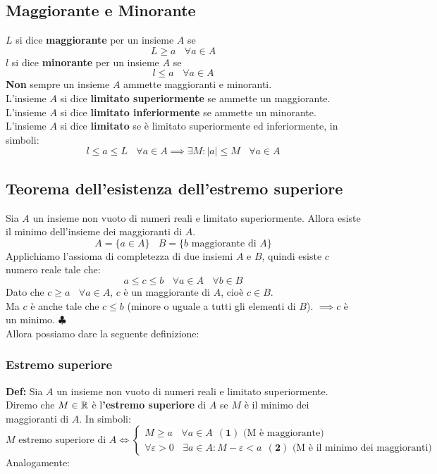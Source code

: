 \subsection{Maggiorante e Minorante}
$L$ si dice \textbf{maggiorante} per un insieme $A$ se
\[
    L \geq a \ \ \ \ \forall a \in A
\]
$l$ si dice \textbf{minorante} per un insieme $A$ se
\[
    l \leq a \ \ \ \ \forall a \in A
\]
\textbf{Non} sempre un insieme $A$ ammette maggioranti e minoranti.\\
L'insieme $A$ si dice \textbf{limitato superiormente} se ammette un maggiorante.\\
L'insieme $A$ si dice \textbf{limitato inferiormente} se ammette un minorante.\\
L'insieme $A$ si dice \textbf{limitato} se è limitato superiormente ed inferiormente, in simboli:
\[
    l\leq a \leq L \ \ \ \ \forall a \in A \implies \exists M : |a| \leq M \ \ \ \ \forall a \in A
\]

\subsection{Teorema dell'esistenza dell'estremo superiore}
Sia $A$ un insieme non vuoto di numeri reali e limitato superiormente. Allora
esiste il minimo dell'insieme dei maggioranti di $A$.
\[
    A = \{a\in A\} \ \ \ \ B = \{b \text{ maggiorante di } A\}
\]
Applichiamo l'assioma di completezza di due insiemi $A$ e $B$, quindi esiste
$c$ numero reale tale che:
\[
    a \leq c \leq b \ \ \ \ \forall a \in A \ \ \ \ \forall b \in B
\]
Dato che $c \geq a \ \ \ \ \forall a \in A$, $c$ è un maggiorante di $A$, cioè
$c \in B$.\\ Ma $c$ è anche tale che $c\leq b$ (minore o uguale a tutti gli
elementi di $B$). $\implies c$ è un minimo. $\clubsuit$\\ Allora possiamo dare
la seguente definizione:\\
\subsubsection{Estremo superiore}
\textbf{Def:} Sia $A$ un insieme non vuoto di numeri
reali e limitato superiormente. Diremo che $M\in \mathbb{R}$ è l\textbf{'estremo
    superiore} di $A$ se $M$ è il minimo dei maggioranti di $A$. In simboli:
\[
    M \text{ estremo superiore di } A \iff \begin{cases}
        M \geq a  \ \ \ \ \forall a \in A \ \ (\textbf{1}) \text{ (M è maggiorante)} \\
        \forall \varepsilon > 0 \ \ \ \ \exists a \in A : M - \varepsilon < a \ \ (\textbf{2}) \text{ (M è il minimo dei maggioranti)}
    \end{cases}
\]
Analogamente:
